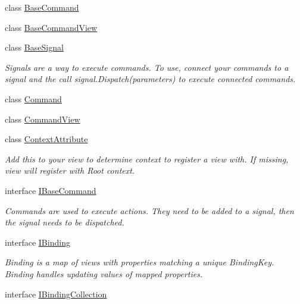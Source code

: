 \begin{DoxyCompactItemize}
\item 
class \mbox{\hyperlink{classcp_games_1_1core_1_1_rapid_m_v_c_1_1_base_command}{Base\+Command}}
\item 
class \mbox{\hyperlink{classcp_games_1_1core_1_1_rapid_m_v_c_1_1_base_command_view}{Base\+Command\+View}}
\item 
class \mbox{\hyperlink{classcp_games_1_1core_1_1_rapid_m_v_c_1_1_base_signal}{Base\+Signal}}
\begin{DoxyCompactList}\small\item\em Signals are a way to execute commands. To use, connect your commands to a signal and the call signal.\+Dispatch(parameters) to execute connected commands. \end{DoxyCompactList}\item 
class \mbox{\hyperlink{classcp_games_1_1core_1_1_rapid_m_v_c_1_1_command}{Command}}
\item 
class \mbox{\hyperlink{classcp_games_1_1core_1_1_rapid_m_v_c_1_1_command_view}{Command\+View}}
\item 
class \mbox{\hyperlink{classcp_games_1_1core_1_1_rapid_m_v_c_1_1_context_attribute}{Context\+Attribute}}
\begin{DoxyCompactList}\small\item\em Add this to your view to determine context to register a view with. If missing, view will register with Root context. \end{DoxyCompactList}\item 
interface \mbox{\hyperlink{interfacecp_games_1_1core_1_1_rapid_m_v_c_1_1_i_base_command}{I\+Base\+Command}}
\begin{DoxyCompactList}\small\item\em Commands are used to execute actions. They need to be added to a signal, then the signal needs to be dispatched. \end{DoxyCompactList}\item 
interface \mbox{\hyperlink{interfacecp_games_1_1core_1_1_rapid_m_v_c_1_1_i_binding}{I\+Binding}}
\begin{DoxyCompactList}\small\item\em Binding is a map of views with properties matching a unique Binding\+Key. Binding handles updating values of mapped properties. \end{DoxyCompactList}\item 
interface \mbox{\hyperlink{interfacecp_games_1_1core_1_1_rapid_m_v_c_1_1_i_binding_collection}{I\+Binding\+Collection}}

\end{DoxyCompactItemize}
